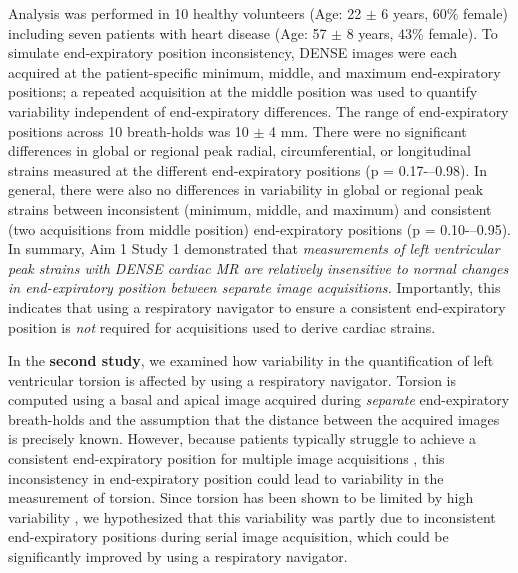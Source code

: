 	Analysis was performed in 10 healthy volunteers (Age: 22 $\pm$ 6 years, 60\% female) including seven patients with heart disease (Age: 57 $\pm$ 8 years, 43\% female). To simulate end-expiratory position inconsistency, DENSE images were each acquired at the patient-specific minimum, middle, and maximum end-expiratory positions; a repeated acquisition at the middle position was used to quantify variability independent of end-expiratory differences. The range of end-expiratory positions across 10 breath-holds was 10 $\pm$ 4 mm. There were no significant differences in global or regional peak radial, circumferential, or longitudinal strains measured at the different end-expiratory positions (p = 0.17-–0.98). In general, there were also no differences in variability in global or regional peak strains between inconsistent (minimum, middle, and maximum) and consistent (two acquisitions from middle position) end-expiratory positions (p = 0.10-–0.95). In summary, Aim 1 Study 1 demonstrated that \textit{measurements of left ventricular peak strains with DENSE cardiac MR are relatively insensitive to normal changes in end-expiratory position between separate image acquisitions.} Importantly, this indicates that using a respiratory navigator to ensure a consistent end-expiratory position is \textit{not} required for acquisitions used to derive cardiac strains.

	In the \textbf{second study}, we examined how variability in the quantification of left ventricular torsion is affected by using a respiratory navigator. Torsion is computed using a basal and apical image acquired during \textit{separate} end-expiratory breath-holds and the assumption that the distance between the acquired images is precisely known. However, because patients typically struggle to achieve a consistent end-expiratory position for multiple image acquisitions \cite{Liu1993,Wang1995a,Taylor1997a,Holland1998c,Fischer2006a}, this inconsistency in end-expiratory position could lead to variability in the measurement of torsion. Since torsion has been shown to be limited by high variability \cite{Donekal2013a}, we hypothesized that this variability was partly due to inconsistent end-expiratory positions during serial image acquisition, which could be significantly improved by using a respiratory navigator.

